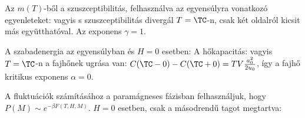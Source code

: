   Az $m(T)$-ből a szuszceptibilitás, felhasználva az egyensúlyra vonatkozó egyenleteket:
  vagyis s szuszceptibilitás divergál $T=\TC$-n, csak két oldalról kicsit más együtthatóval.
   Az exponens $\gamma=1$. 
  
  A szabadenergia az egyensúlyban és $H=0$ esetben:
  A hőkapacitás:
  vagyis $T=\TC$-n a fajhőnek ugrása van: $C(\TC-0)-C(\TC+0)=TV\frac{a_0^2}{2u_0}$, így a fajhő kritikus exponens $\alpha=0$.
  
  A fluktuációk számításához a paramágneses fázisban felhasználjuk, hogy $P(M)\sim e^{-\beta F(T,H,M)}$. $H=0$ esetben, csak a másodrendű tagot megtartva:
  
